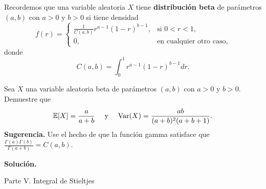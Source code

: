 \documentclass[11pt]{scrartcl}
\begin{document}
\noindent Recordemos que una variable aleatoria $X$ tiene \textbf{distribución beta} de parámetros $(a,b)$ con $a>0$ y $b>0$ si tiene densidad
\begin{equation*}
    f(r)=
    \begin{cases}
        \frac{1}{C(a,b)}r^{a-1}(1-r)^{b-1}, & \text{si } 0<r<1, \\
        0, & \text{en cualquier otro caso,}
    \end{cases}
\end{equation*}
donde
\begin{equation*}
    C(a,b)=\int_{0}^{1}r^{a-1}(1-r)^{b-1}dr.
\end{equation*}

\begin{mdframed}[style=mdpurplebox, frametitle={Ejercicio 06, Tarea 11, Probabilidad y Estadística I}]
    Sea $X$ una variable aleatoria beta de parámetros $(a,b)$ con $a>0$ y $b>0$. Demuestre que
    \begin{equation*}
        \mathbb E[X]=\frac{a}{a+b} \quad \text{ y } \quad \text{Var}(X)=\frac{ab}{(a+b)^2(a+b+1)}.
    \end{equation*}
    \textbf{Sugerencia.} Use el hecho de que la función gamma satisface que $\frac{\Gamma(a)\Gamma(b)}{\Gamma(a+b)}=C(a,b)$.
\end{mdframed}
\textbf{Solución.} 

\begin{center}
    Parte V. Integral de Stieltjes
\end{center}
\end{document}
